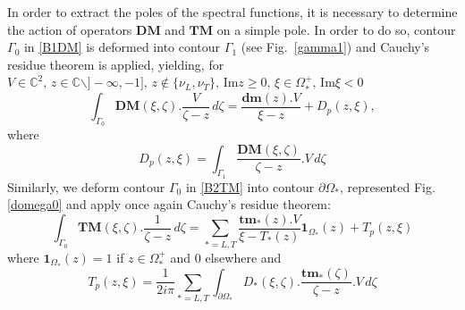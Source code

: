 In order to extract the poles of the spectral functions, it is necessary to determine the action of operators $\mathbf{DM}$ and $\mathbf{TM}$ on a simple pole. In order to do so, contour $\Gamma_0$ in \eqref{B1DM} is deformed into contour $\Gamma_1$ (see Fig.~\ref{gamma1}) and Cauchy's residue theorem is applied, yielding, for
$ V\in\mathbb{C}^2, \, z\in \mathbb{C} \backslash  \rbrack - \infty, -1 \rbrack , \,  z \notin \{\nu_L,\nu_T \}, \, \mbox{Im} z \geq 0, \, \xi \in \Omega_*^+, \, \mbox{Im} \xi <0 $
\begin{equation}
\int_{\Gamma_0} \textbf{DM}(\xi,\zeta).\frac{V}{\zeta-z}\,d\zeta = \frac{\textbf{dm}(z).V}{\xi-z}+D_p(z,\xi),
\label{GaussDM}
\end{equation}
where
\begin{equation}
D_p(z,\xi)= \int_{\Gamma_1} \frac{\textbf{DM}(\xi,\zeta)}{\zeta-z}.V\,d\zeta
\label{defDp}
\end{equation}
Similarly, we deform contour $\Gamma_0$ in \eqref{B2TM} into contour $\partial \Omega_*$, represented Fig. \ref{domega0} and apply once again Cauchy's residue theorem:
\begin{equation}
\int_{\Gamma_0} \textbf{TM}(\xi,\zeta).\frac{1}{\zeta-z}\,d\zeta = \sum_{*=L,T} \frac{\textbf{tm}_*(z).V}{\xi-T_*(z)}\textbf{1}_{\Omega_*}(z)+T_p(z,\xi)
\label{GaussTM}
\end{equation}
where $\textbf{1}_{\Omega_*}(z)=1$ if $z\in\Omega_*^+$ and $0$ elsewhere and
\begin{equation}
T_p(z,\xi)= \frac{1}{2i\pi} \sum_{*=L,T} \int_{\partial \Omega_*} D_*(\xi,\zeta) .\frac{\textbf{tm}_*(\zeta)}{\zeta-z}.V\, d\zeta
\label{defTp}
\end{equation}

